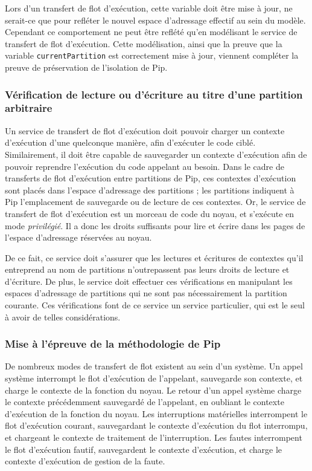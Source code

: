 		Lors d'un transfert de flot d'exécution, cette variable doit être mise à jour, ne serait-ce que pour refléter le nouvel espace d'adressage effectif au sein du modèle. Cependant ce comportement ne peut être reflété qu'en modélisant le service de transfert de flot d'exécution. Cette modélisation, ainsi que la preuve que la variable \texttt{currentPartition} est correctement mise à jour, viennent compléter la preuve de préservation de l'isolation de Pip.

		\subsubsection{Vérification de lecture ou d'écriture au titre d'une partition arbitraire}

		Un service de transfert de flot d'exécution doit pouvoir charger un contexte d'exécution d'une quelconque manière, afin d'exécuter le code ciblé. Similairement, il doit être capable de sauvegarder un contexte d'exécution afin de pouvoir reprendre l'exécution du code appelant au besoin. Dans le cadre de transferts de flot d'exécution entre partitions de Pip, ces contextes d'exécution sont placés dans l'espace d'adressage des partitions ; les partitions indiquent à Pip l'emplacement de sauvegarde ou de lecture de ces contextes. Or, le service de transfert de flot d'exécution est un morceau de code du noyau, et s'exécute en mode \emph{privilégié}. Il a donc les droits suffisants pour lire et écrire dans les pages de l'espace d'adressage réservées au noyau.

		De ce fait, ce service doit s'assurer que les lectures et écritures de contextes qu'il entreprend au nom de partitions n'outrepassent pas leurs droits de lecture et d'écriture. De plus, le service doit effectuer ces vérifications en manipulant les espaces d'adressage de partitions qui ne sont pas nécessairement la partition courante. Ces vérifications font de ce service un service particulier, qui est le seul à avoir de telles considérations.

		\subsubsection{Mise à l'épreuve de la méthodologie de Pip}
		
		De nombreux modes de transfert de flot existent au sein d'un système. Un appel système interrompt le flot d'exécution de l'appelant, sauvegarde son contexte, et charge le contexte de la fonction du noyau. Le retour d'un appel système charge le contexte précédemment sauvegardé de l'appelant, en oubliant le contexte d'exécution de la fonction du noyau. Les interruptions matérielles interrompent le flot d'exécution courant, sauvegardant le contexte d'exécution du flot interrompu, et chargeant le contexte de traitement de l'interruption. Les fautes interrompent le flot d'exécution fautif, sauvegardent le contexte d'exécution, et charge le contexte d'exécution de gestion de la faute.


